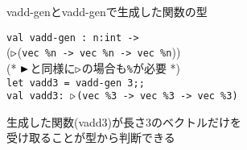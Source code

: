 \documentclass[dvipdfmx,aspectratio=169, 20pt]{beamer}
\begin{document}
\begin{frame}[fragile]{vadd-genとvadd-genで生成した関数の型}
    \newcommand{\Vn}{\text{vec}\ \%n}
    \newcommand{\Vt}{\text{vec}\ \%3}
    \begin{exampleblock}{}
        \hspace{5mm} \verb|val vadd-gen : n:int -> | \\
        \hspace{20mm} (${\mathop{\triangleright}}$(\verb|vec %n -> vec %n -> vec %n|)) \\[2mm]
        \hspace{5mm} (* ${\mathop{\blacktriangleright}}$と同様に${\mathop{\triangleright}}$の場合も\verb|%|が必要 *) \\[5mm]
        \hspace{5mm} \verb|let vadd3 = vadd-gen 3;;| \\
        \hspace{5mm} \verb|val vadd3: |${\mathop{\triangleright}}$\verb|(vec %3 -> vec %3 -> vec %3)|
    \end{exampleblock}
    生成した関数(vadd3)が長さ3のベクトルだけを\\受け取ることが型から判断できる
\end{frame}
\end{document}
